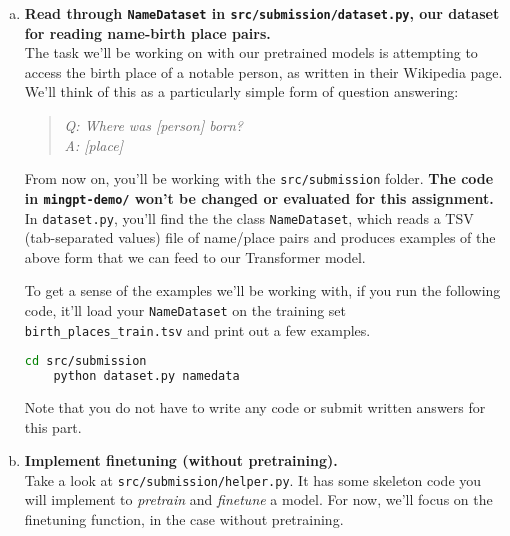 \begin{enumerate}[(a)]
\item {} \textbf{Read through \texttt{NameDataset} in \texttt{src/submission/dataset.py}, our dataset for reading name-birth place pairs.}\\
The task we'll be working on with our pretrained models is attempting to access the birth place of a notable person, as written in their Wikipedia page.
We'll think of this as a particularly simple form of question answering:
\begin{quote}
    \textit{Q: Where was \textit{[person]} born?}\\
    \textit{A: [place]}
\end{quote}
From now on, you'll be working with the \texttt{src/submission} folder. \textbf{The code in \texttt{mingpt-demo/} won't be changed or evaluated for this assignment.}
In \texttt{dataset.py}, 
you'll find the the class \texttt{NameDataset}, which reads a TSV (tab-separated values) file of name/place pairs and produces examples of the above form that we can feed to our Transformer model.


To get a sense of the examples we'll be working with, if you run the following code, it'll load your \texttt{NameDataset} on the training set \texttt{birth\_places\_train.tsv} and print out a few examples.
\begin{lstlisting}[language=bash]
    cd src/submission
    python dataset.py namedata 
\end{lstlisting}

Note that you do not have to write any code or submit written answers for this part.

\item {} \textbf{Implement finetuning (without pretraining).}\\
Take a look at \texttt{src/submission/helper.py}. It has some skeleton code you will implement to \textit{pretrain} and \textit{finetune} a model. For now, we'll focus on the finetuning function, in the case without pretraining.


\end{enumerate}
